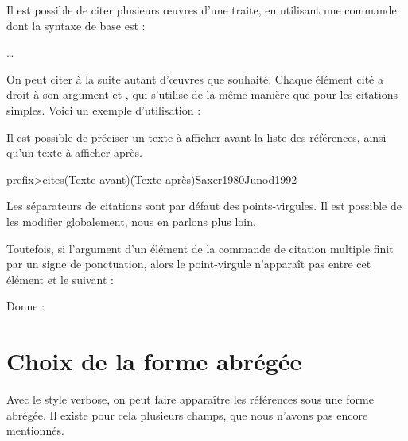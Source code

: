 Il est possible de citer plusieurs œuvres d'une traite, en  utilisant une commande dont la syntaxe de base est :

 …

On peut  citer à la suite autant d'œuvres que souhaité. Chaque élément cité a droit à son argument  et , qui s'utilise de la même manière que pour les citations simples.
Voici un exemple d'utilisation : 

\begin{latexcode}
\autocites{Saxer1980}{Junod1992}
\end{latexcode}

\begin{quotation}
\cites{Saxer1980}{Junod1992}
\end{quotation}

Il est possible de préciser un texte à afficher avant la liste des références, ainsi qu'un texte à afficher après.

\begin{latexcode}
\<prefix>cites(Texte avant)(Texte après){Saxer1980}{Junod1992}
\end{latexcode}

Les séparateurs de citations sont par défaut des points-virgules. Il est possible de les modifier globalement, nous en parlons plus loin.

Toutefois, si l'argument  d'un élément de la commande de citation multiple finit par un signe de ponctuation, alors le point-virgule n'apparaît pas entre cet élément et le suivant :

\begin{latexcode}
\autocites[on consultera également :]{Saxer1980}{Urner1952}
\end{latexcode}

Donne :

\begin{quotation}
\cites[on consultera également :]{Saxer1980}{Urner1952}
\end{quotation}




\section{Choix de la forme abrégée}\label{shortfields}

Avec le style verbose, on peut faire apparaître les références sous une forme abrégée. Il existe pour cela plusieurs champs, que nous n'avons pas encore mentionnés.

